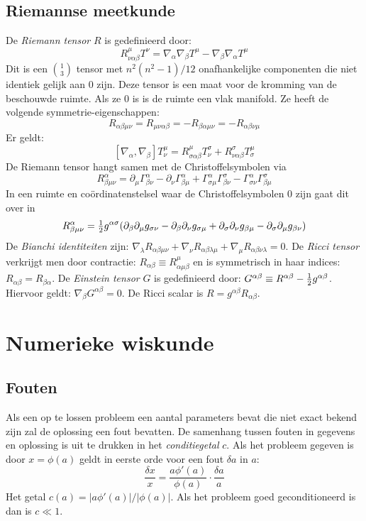 \section{Riemannse meetkunde}
De {\it Riemann tensor} $R$ is gedefinieerd door:
\[
R^\mu_{\nu\alpha\beta}T^\nu=\nabla_\alpha\nabla_\beta T^\mu-\nabla_\beta\nabla_\alpha T^\mu
\]
Dit is een $1\choose 3$ tensor met $n^2(n^2-1)/12$ onafhankelijke componenten
die niet identiek gelijk aan 0 zijn. Deze tensor is een maat voor de kromming
van de beschouwde ruimte. Als ze 0 is is de ruimte een vlak manifold.
Ze heeft de volgende symmetrie-eigenschappen:
\[
R_{\alpha\beta\mu\nu}=R_{\mu\nu\alpha\beta}=-R_{\beta\alpha\mu\nu}=-R_{\alpha\beta\nu\mu}
\]
Er geldt:
\[
[\nabla_\alpha,\nabla_\beta]T_\nu^\mu=R_{\sigma\alpha\beta}^\mu T_\nu^\sigma+R_{\nu\alpha\beta}^\sigma T_\sigma^\mu
\]
De Riemann tensor hangt samen met de Christoffelsymbolen via
\[
R^\alpha_{\beta\mu\nu}=\partial_\mu\Gamma^\alpha_{\beta\nu}-\partial_\nu\Gamma^\alpha_{\beta\mu}+\Gamma^\alpha_{\sigma\mu}\Gamma^\sigma_{\beta\nu}-\Gamma^\alpha_{\sigma\nu}\Gamma^\sigma_{\beta\mu}
\]
In een ruimte en co\"ordinatenstelsel waar de Christoffelsymbolen 0 zijn gaat
dit over in
\[
R^\alpha_{\beta\mu\nu}=\mbox{$\frac{1}{2}$} g^{\alpha\sigma}(\partial_\beta\partial_\mu g_{\sigma\nu}-\partial_\beta\partial_\nu g_{\sigma\mu}+\partial_\sigma\partial_\nu g_{\beta\mu}-\partial_\sigma\partial_\mu g_{\beta\nu})
\]
De {\it Bianchi identiteiten} zijn: $\nabla_\lambda R_{\alpha\beta\mu\nu}+\nabla_\nu R_{\alpha\beta\lambda\mu} +\nabla_\mu R_{\alpha\beta\nu\lambda}=0$.
\npar
De {\it Ricci tensor} verkrijgt men door contractie: $R_{\alpha\beta}\equiv R_{\alpha\mu\beta}^\mu$
en is symmetrisch in haar indices: $R_{\alpha\beta}=R_{\beta\alpha}$. De
{\it Einstein tensor} $G$ is gedefinieerd door: $G^{\alpha\beta}\equiv R^{\alpha\beta}-\mbox{$\frac{1}{2}$} g^{\alpha\beta}$.
Hiervoor geldt: $\nabla_\beta G^{\alpha\beta}=0$. De Ricci scalar is
$R=g^{\alpha\beta}R_{\alpha\beta}$.


\chapter{Numerieke wiskunde}
\label{chap:num}
\section{Fouten}
Als een op te lossen probleem een aantal parameters bevat die niet exact bekend
zijn zal de oplossing een fout bevatten. De samenhang tussen fouten in gegevens
en oplossing is uit te drukken in het {\it conditiegetal} $c$. Als het probleem
gegeven is door $x=\phi(a)$ geldt in eerste orde voor een fout $\delta a$ in
$a$:
\[
\frac{\delta x}{x}=\frac{a\phi'(a)}{\phi(a)}\cdot\frac{\delta a}{a}
\]
Het getal $c(a)=|a\phi'(a)|/|\phi(a)|$. Als het probleem goed geconditioneerd
is dan is $c\ll1$.

